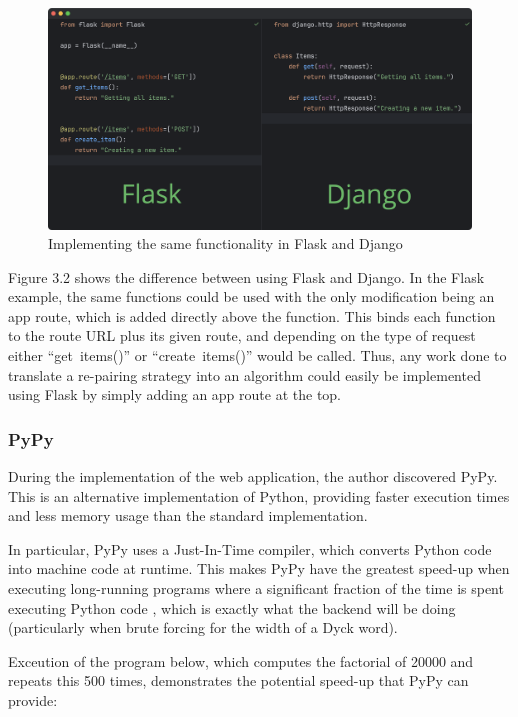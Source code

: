 \begin{figure}[H]
    \centering
    \includegraphics[scale=0.3]{./images/flaskVSdjango.png}
    \caption{Implementing the same functionality in Flask and Django \cite{flaskVSdjango}}
\end{figure}

\noindent Figure 3.2 shows the difference between using Flask and Django. In the Flask example, the same functions could be used with the only modification being an app route, which is added directly above the function. This binds each function to the route URL plus its given route, and depending on the type of request either ``get\textunderscore~items()'' or ``create\textunderscore~items()'' would be called. Thus, any work done to translate a re-pairing strategy into an algorithm could easily be implemented using Flask by simply adding an app route at the top.

\subsubsection{PyPy}
During the implementation of the web application, the author discovered PyPy. This is an alternative implementation of Python, providing faster execution times and less memory usage than the standard implementation.

\par\null\par
\noindent In particular, PyPy uses a Just-In-Time compiler, which converts Python code into machine code at runtime. This makes PyPy have the greatest speed-up when executing long-running programs where a significant fraction of the time is spent executing Python code \cite{whatisPyPy}, which is exactly what the backend will be doing (particularly when brute forcing for the width of a Dyck word). 

\par\null\par
\noindent Exceution of the program below, which computes the factorial of 20000 and repeats this 500 times, demonstrates the potential speed-up that PyPy can provide:

